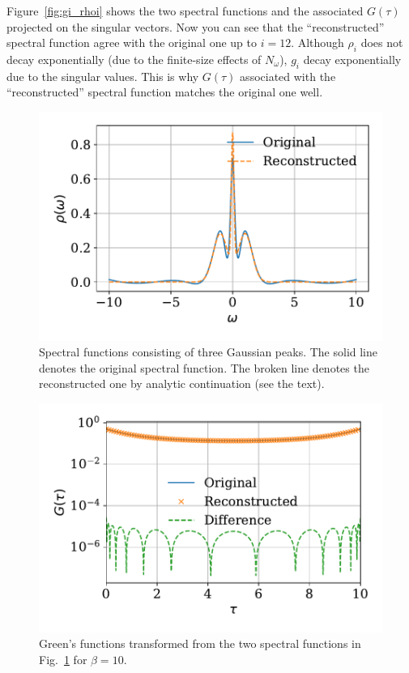 \documentclass[submission, LectureNotes]{SciPost}
\begin{document}
Figure~\ref{fig:gi_rhoi} shows the two spectral functions and the associated $G(\tau)$ projected on the singular vectors.
Now you can see that the ``reconstructed'' spectral function agree with the original one up to $i=12$.
Although $\rho_i$ does not decay exponentially (due to the finite-size effects of $N_\omega$),
$g_i$ decay exponentially due to the singular values.
This is why $G(\tau)$ associated with the ``reconstructed'' spectral function
matches the original one well.

\begin{figure}
    \centering
    \includegraphics[width=0.6\columnwidth]{three_gaussian.pdf}
    \caption{
      Spectral functions consisting of three Gaussian peaks.
      The solid line denotes the original spectral function.
      The broken line denotes the reconstructed one by analytic continuation (see the text).
    }
    \label{fig:three_gaussian}
\end{figure}

\begin{figure}
    \centering
    \includegraphics[width=0.6\columnwidth]{three_gaussian_gtau.pdf}
    \caption{
      Green's functions transformed from the two spectral functions in Fig.~\ref{fig:three_gaussian}
      for $\beta=10$.
      }
    \label{fig:three_gaussian_gtau}
\end{figure}
\end{document}
